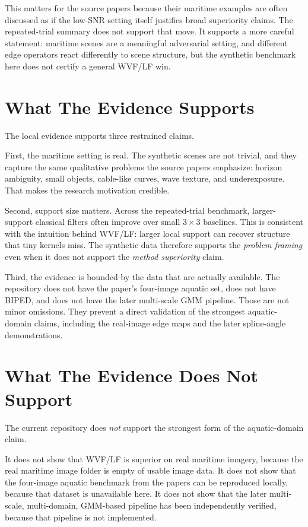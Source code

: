 \documentclass[conference]{IEEEtran}
\begin{document}
This matters for the source papers because their maritime examples are often discussed as if the low-SNR setting itself justifies broad superiority claims. The repeated-trial summary does not support that move. It supports a more careful statement: maritime scenes are a meaningful adversarial setting, and different edge operators react differently to scene structure, but the synthetic benchmark here does not certify a general WVF/LF win.

\section{What The Evidence Supports}
The local evidence supports three restrained claims.

First, the maritime setting is real. The synthetic scenes are not trivial, and they capture the same qualitative problems the source papers emphasize: horizon ambiguity, small objects, cable-like curves, wave texture, and underexposure. That makes the research motivation credible.

Second, support size matters. Across the repeated-trial benchmark, larger-support classical filters often improve over small $3\times3$ baselines. This is consistent with the intuition behind WVF/LF: larger local support can recover structure that tiny kernels miss. The synthetic data therefore supports the \emph{problem framing} even when it does not support the \emph{method superiority} claim.

Third, the evidence is bounded by the data that are actually available. The repository does not have the paper's four-image aquatic set, does not have BIPED, and does not have the later multi-scale GMM pipeline. Those are not minor omissions. They prevent a direct validation of the strongest aquatic-domain claims, including the real-image edge maps and the later spline-angle demonstrations.

\section{What The Evidence Does Not Support}
The current repository does \emph{not} support the strongest form of the aquatic-domain claim.

It does not show that WVF/LF is superior on real maritime imagery, because the real maritime image folder is empty of usable image data. It does not show that the four-image aquatic benchmark from the papers can be reproduced locally, because that dataset is unavailable here. It does not show that the later multi-scale, multi-domain, GMM-based pipeline has been independently verified, because that pipeline is not implemented.
\end{document}
